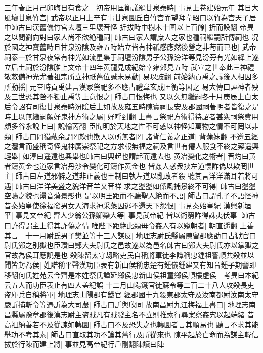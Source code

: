 三年春正月己卯晦日有食之　初帝用匡衡議罷甘泉泰畤|{
	事見上卷建始元年}
其日大風壞甘泉竹宫|{
	武帝以正月上辛有事甘泉圜丘自竹宫而望拜韋昭曰以竹為宫天子居中師古曰漢舊儀竹宫去壇三里壞音怪}
折拔畤中樹木十圍以上百餘|{
	折而設翻}
帝異之以問劉向對曰家人尚不欲絶種祠|{
	師古曰家人謂庶人之家也種祠繼嗣所傳祠也}
况於國之神寶舊畤且甘泉汾隂及雍五畤始立皆有神祇感應然後營之非苟而已也|{
	武帝祠泰一於甘泉夜常有神光如流星集于祠壇汾隂男子公孫滂洋等見汾旁有光如絳上遂立后土祠於汾隂脽上文帝十四年黄龍見成紀始幸雍郊見五畤}
武宣之世奉此三神禮敬敕備神光尤著祖宗所立神祇舊位誠未易動|{
	易以豉翻}
前始納貢禹之議後人相因多所動揺|{
	元帝時貢禹建言漢家祭祀多不應古禮韋玄成匡衡等因之}
易大傳曰誣神者殃及三世恐其咎不獨止禹等上意恨之|{
	師古曰恨悔也}
又以久無繼嗣冬十月庚辰上白太后令詔有司復甘泉泰畤汾隂后土如故及雍五畤陳寶祠長安及郡國祠著明者皆復之是時上以無繼嗣頗好鬼神方術之屬|{
	好呼到翻}
上書言祭祀方術得待詔者甚衆祠祭費用頗多谷永說上曰|{
	說輸芮翻}
臣聞明於天地之性不可惑以神怪知萬物之情不可罔以非類|{
	師古曰罔猶蔽余謂罔欺也欺人以所無者罔}
諸背仁義之正道|{
	背蒲妺翻}
不遵五經之灋言而盛稱奇怪鬼神廣崇祭祀之方求報無福之祠及言世有僊人服食不終之藥遥興輕舉|{
	如淳曰遥遠也興舉也師古曰興起也謂起而遠去也}
黄冶變化之術者|{
	晋灼曰黄者鑄黄金也道家言冶丹沙令變化可鑄作黄金也}
皆姦人惑衆挟左道懷詐偽以欺罔世主|{
	師古曰左道邪僻之道非正義也王制曰執左道以亂政者殺}
聽其言洋洋滿耳若將可遇|{
	師古曰洋洋美盛之貌洋音羊又音祥}
求之盪盪如係風捕景終不可得|{
	師古曰盪盪空曠之貌也盪音蕩景影也}
是以明王距而不聽聖人絶而不語|{
	師古曰謂孔子不語怪神}
昔秦始皇使徐福發男女入海求神采藥因逃不還天下怨恨|{
	事見秦始皇紀}
漢興新垣平|{
	事見文帝紀}
齊人少翁公孫卿欒大等|{
	事見武帝紀}
皆以術窮詐得誅夷伏辜|{
	師古曰詐得謂主上得其詐偽之情}
唯陛下距絶此類毋令姦人有以窺朝者|{
	朝直遥翻}
上善其言　十一月尉氏男子樊並等十三人謀反|{
	地理志尉氏縣屬陳留郡應劭曰古獄官曰尉氏鄭之别獄也臣瓚曰鄭大夫尉氏之邑故遂以為邑名師古曰鄭大夫尉氏亦以掌獄之官故為侯耳應說是也}
殺陳留太守刼略吏民自稱將軍徒李譚稱忠鍾祖訾順共殺並以聞皆封為侯|{
	姓譜稱平聲漢功臣表有新山侯稱忠楚有鍾儀鍾建又有知音鍾子期訾即移翻何氏姓苑云今齊是本姓祭氏譚延鄉侯忠新山侯祖童鄉侯順樓虛侯　考異曰本紀云五人而功臣表止有四人盖紀誤}
十二月山陽鐵官徒蘇令等二百二十八人攻殺長吏盗庫兵自稱將軍|{
	地理志山陽郡有鐵官}
經郡國十九殺東郡太守及汝南都尉汝南太守嚴訢捕斬令等遷訢為大司農|{
	師古曰訢與欣同}
故南昌尉九江梅福上書曰|{
	地理志南昌縣屬豫章郡後漢志尉主盗賊凡有賊發主名不立則推索行尋案察姦宄以起端緒}
昔高祖納善若不及從諫如轉圜|{
	師古曰不及恐失之也轉圜者言其順易也}
聽言不求其能舉功不考其素|{
	師古曰直取其功不論其舊行及所從來也}
陳平起於亡命而為謀主韓信拔於行陳而建上將|{
	事並見高帝紀行戶剛翻陳讀曰陣}
